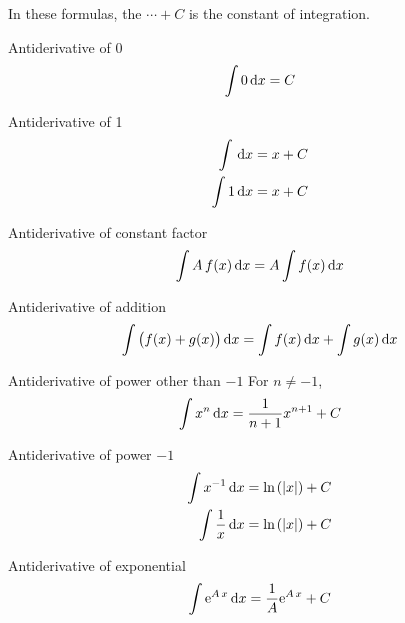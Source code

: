
In these formulas, the $\cdots + C$ is the constant of integration.

\begin{multicols}{2}

 \begin{FormulaBox}{Antiderivative of 0}
  \begin{equation*}
   \int  0  \,\mathrm{d}{x} = C
  \end{equation*}
 \end{FormulaBox}

 \begin{FormulaBox}{Antiderivative of 1}
  \begin{equation*}
   \begin{split}
     \int  \,\mathrm{d}{x} &= x + C
     \\
     \int  1  \,\mathrm{d}{x} &= x + C
   \end{split}
  \end{equation*}
 \end{FormulaBox}

 \begin{FormulaBox}{Antiderivative of constant factor}
  \begin{equation*}
   \int  A \, f(x)  \,\mathrm{d}{x}
   =
   A \int  f(x)  \,\mathrm{d}{x}
  \end{equation*}
 \end{FormulaBox}

 \begin{FormulaBox}{Antiderivative of addition}
  \begin{equation*}
   \int  \big( f(x) + g(x) \big)  \,\mathrm{d}{x}
   =
   \int  f(x)  \,\mathrm{d}{x}
   + \int  g(x)  \,\mathrm{d}{x}
  \end{equation*}
 \end{FormulaBox}

 \begin{FormulaBox}{Antiderivative of power other than $-1$}
  For $n \neq -1$,
  \begin{equation*}
   \int  x^n  \,\mathrm{d}{x}
   =
   \frac{1}{n+1} x^{n+1} + C
  \end{equation*}
 \end{FormulaBox}

 \begin{FormulaBox}{Antiderivative of power $-1$}
  \begin{equation*}
   \begin{split}
     \int  x^{-1}  \,\mathrm{d}{x}
     &=
       \mathrm{ln}\hspace{-0.1ex}\left(\left\lvert x\right\rvert\right) + C
     \\
     \int  \frac{1}{x}  \,\mathrm{d}{x}
     &=
       \mathrm{ln}\hspace{-0.1ex}\left(\left\lvert x\right\rvert\right) + C
   \end{split}
  \end{equation*}
 \end{FormulaBox}

 \begin{FormulaBox}{Antiderivative of exponential}
  \begin{equation*}
   \int \mathrm{e}^{A\,x} \,\mathrm{d}{x}
   = \frac{1}{A} \mathrm{e}^{A\,x} + C
  \end{equation*}
 \end{FormulaBox}

\end{multicols}

